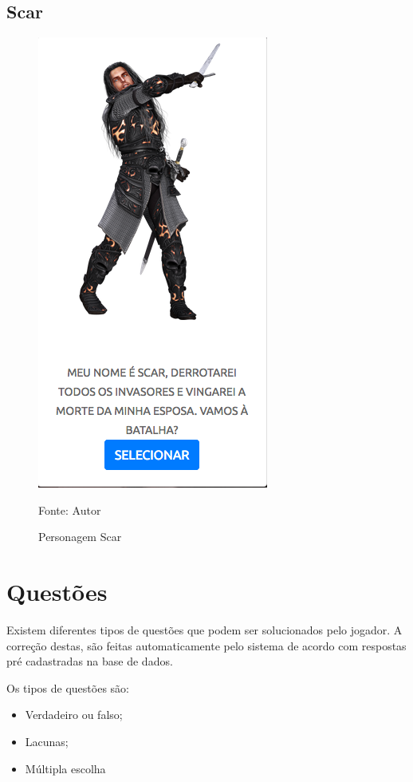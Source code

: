 \subsection{Scar}
\begin{figure}[h]
	\centering
	\includegraphics[keepaspectratio=true,scale=0.5]{figuras/scar.png}
	\caption{Personagem Scar}
	Fonte: Autor
	\label{scar}
\end{figure}

\section{Questões}
Existem diferentes tipos de questões que podem ser solucionados pelo jogador. A correção destas, são feitas automaticamente
pelo sistema de acordo com respostas pré cadastradas na base de dados.

Os  tipos de questões são:

\begin{itemize}
	\item Verdadeiro ou falso;
	\item Lacunas;
	\item Múltipla escolha
\end{itemize}

